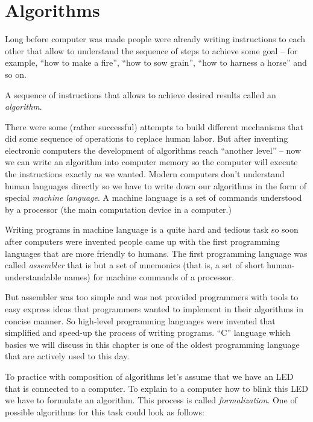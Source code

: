 \documentclass[../sparc.tex]{subfiles}
\begin{document}
\section{Algorithms}

Long before computer was made people were already writing instructions to each
other that allow to understand the sequence of steps to achieve some goal -- for
example, ``how to make a fire'', ``how to sow grain'', ``how to harness a
horse'' and so on.

A sequence of instructions that allows to achieve desired results called an
\emph{algorithm}.

There were some (rather successful) attempts to build different mechanisms that
did some sequence of operations to replace human labor.  But after inventing
electronic computers the development of algorithms reach ``another level'' --
now we can write an algorithm into computer memory so the computer will execute
the instructions exactly as we wanted.  Modern computers don't understand human
languages directly so we have to write down our algorithms in the form of
special \emph{machine language}.  A machine language is a set of commands
understood by a processor (the main computation device in a computer.)

Writing programs in machine language is a quite hard and tedious task so soon
after computers were invented people came up with the first programming
languages that are more friendly to humans.  The first programming language was
called \emph{assembler} that is but a set of mnemonics (that is, a set of short
human-understandable names) for machine commands of a processor.

But assembler was too simple and was not provided programmers with tools to easy
express ideas that programmers wanted to implement in their algorithms in
concise manner.  So high-level programming languages were invented that
simplified and speed-up the process of writing programs.  ``C'' language which
basics we will discuss in this chapter is one of the oldest programming language
that are actively used to this day.

To practice with composition of algorithms let's assume that we have an LED that
is connected to a computer.  To explain to a computer how to blink this LED we
have to formulate an algorithm.  This process is called \emph{formalization}.
One of possible algorithms for this task could look as follows:
\end{document}
